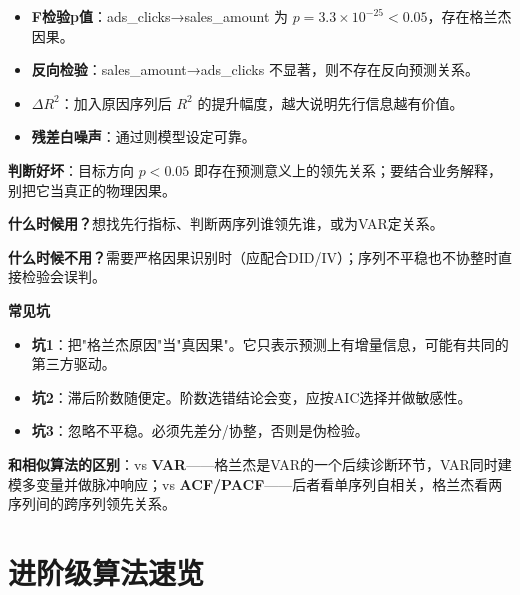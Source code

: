 \begin{algoresult}
\begin{itemize}
    \item \textbf{F检验p值}：ads\_clicks→sales\_amount 为 $p=3.3\times10^{-25}<0.05$，存在格兰杰因果。
    \item \textbf{反向检验}：sales\_amount→ads\_clicks 不显著，则不存在反向预测关系。
    \item \textbf{$\Delta R^2$}：加入原因序列后 $R^2$ 的提升幅度，越大说明先行信息越有价值。
    \item \textbf{残差白噪声}：通过则模型设定可靠。
\end{itemize}

\textbf{判断好坏}：目标方向 $p<0.05$ 即存在预测意义上的领先关系；要结合业务解释，别把它当真正的物理因果。
\end{algoresult}

\begin{algonotes}
\textbf{什么时候用？}想找先行指标、判断两序列谁领先谁，或为VAR定关系。

\textbf{什么时候不用？}需要严格因果识别时（应配合DID/IV）；序列不平稳也不协整时直接检验会误判。

\textbf{常见坑}
\begin{itemize}
    \item \textbf{坑1}：把"格兰杰原因"当"真因果"。它只表示预测上有增量信息，可能有共同的第三方驱动。
    \item \textbf{坑2}：滞后阶数随便定。阶数选错结论会变，应按AIC选择并做敏感性。
    \item \textbf{坑3}：忽略不平稳。必须先差分/协整，否则是伪检验。
\end{itemize}

\textbf{和相似算法的区别}：vs \textbf{VAR}——格兰杰是VAR的一个后续诊断环节，VAR同时建模多变量并做脉冲响应；vs \textbf{ACF/PACF}——后者看单序列自相关，格兰杰看两序列间的跨序列领先关系。
\end{algonotes}

\section{进阶级算法速览}


